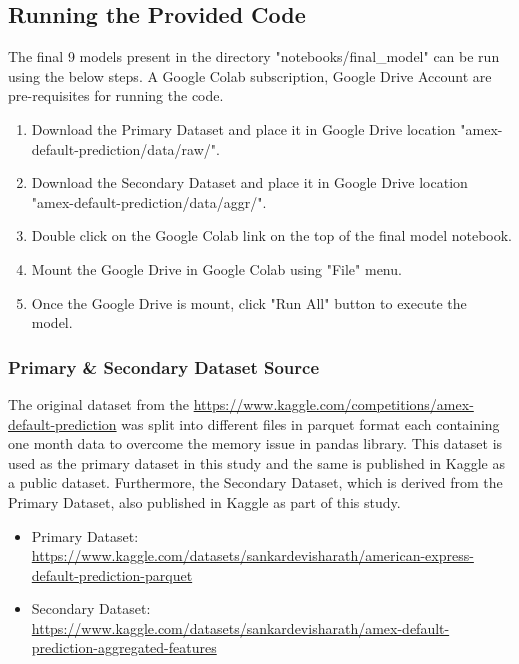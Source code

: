 \documentclass[twoside,11pt,a4paper]{article}
\begin{document}
\subsection{Running the Provided Code}
The final 9 models present in the directory "notebooks/final\_model" can be run using the below steps. A Google Colab subscription, Google Drive Account are  pre-requisites for running the code.
\begin{enumerate}
	\item Download the Primary Dataset and place it in Google Drive location "amex-default-prediction/data/raw/".
	\item Download the Secondary Dataset and place it in Google Drive location "amex-default-prediction/data/aggr/".
	\item Double click on the Google Colab link on the top of the final model notebook.
	\item Mount the Google Drive in Google Colab using "File" menu.
	\item Once the Google Drive is mount, click "Run All" button to execute the model.
\end{enumerate}

\subsubsection{Primary \& Secondary Dataset Source}
The original dataset from the \url{https://www.kaggle.com/competitions/amex-default-prediction} was split into different files in parquet format each containing one month data to overcome the memory issue in pandas library. This dataset is used as the primary dataset in this study and the same is published in Kaggle as a public dataset. Furthermore, the Secondary Dataset, which is derived from the Primary Dataset, also published in Kaggle as part of this study.

\begin{itemize}
	\item Primary Dataset: \url{https://www.kaggle.com/datasets/sankardevisharath/american-express-default-prediction-parquet}
	\item Secondary Dataset: \url{https://www.kaggle.com/datasets/sankardevisharath/amex-default-prediction-aggregated-features}
\end{itemize}

\clearpage
\end{document}
